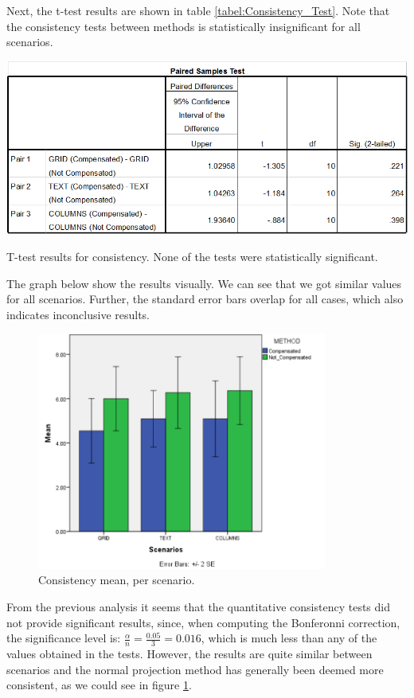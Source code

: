 \documentclass[]{article}
\begin{document}
Next, the t-test results are shown in table \ref{tabel:Consistency_Test}. Note that the consistency tests between methods is statistically insignificant for all scenarios.

\begin{table}[!h]
  \includegraphics[width=\linewidth]{figures/results/Consistency_Test.PNG}
  \caption{T-test results for consistency. None of the tests were statistically significant.}
  \label{tabel:Consistency_Test}
\end{table}

The graph below show the results visually. We can see that we got similar values for all scenarios. Further, the standard error bars overlap for all cases, which also indicates inconclusive results.

\begin{figure}[!h]
    \centering
    \includegraphics[width=0.85\textwidth]{figures/results/Consistency_Graph.PNG}
    \caption{Consistency mean, per scenario.}
    \label{fig:Consistency_Graph}
\end{figure}

From the previous analysis it seems that the quantitative consistency tests did not provide significant results, since, when computing the Bonferonni correction, the significance level is: $\frac{\alpha}{n} = \frac{0.05}{3} = 0.016$, which is much less than any of the values obtained in the tests. However, the results are quite similar between scenarios and the normal projection method has generally been deemed more consistent, as we could see in figure \ref{fig:Consistency_Graph}. 
\end{document}
